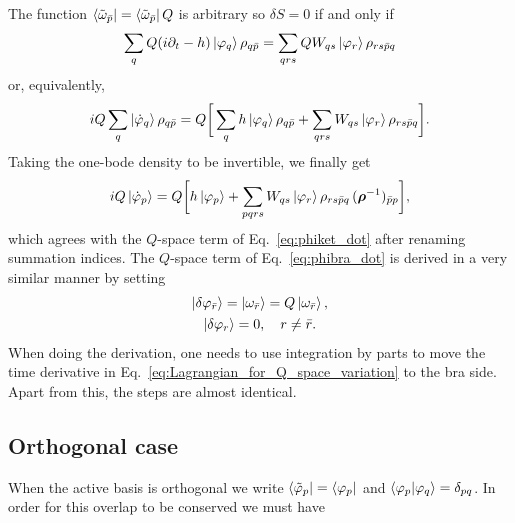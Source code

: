 \documentclass[aip,jcp,preprint,superscriptaddress,nofootinbib]{revtex4-1}
\begin{document}
The function $\bra{\tilde{\omega}_{\bar{p}}} = \bra{\tilde{\omega}_{\bar{p}}} Q$ is
arbitrary so $\delta S = 0$ if and only if
\begin{align}
    \sum_{q} Q (i \partial_t - h) \ket{\varphi_{q}} \rho_{q\bar{p}}
    = \sum_{qrs} Q W_{qs} \ket{\varphi_{r}} \rho_{rs\bar{p}q}
\end{align}
or, equivalently,
\begin{align}
    i Q \sum_{q} \ket{\dot{\varphi}_{q}} \rho_{q\bar{p}}
    = 
    Q \bigg[ \sum_{q} h \ket{\varphi_{q}} \rho_{q\bar{p}}
    + \sum_{qrs} W_{qs} \ket{\varphi_{r}} \rho_{rs\bar{p}q} \bigg].
\end{align}
Taking the one-bode density to be invertible, we finally get
\begin{align}
    i Q \ket{\dot{\varphi}_{p}}
    = 
    Q \bigg[ h \ket{\varphi_{p}}
    + \sum_{pqrs} W_{qs} \ket{\varphi_{r}} \rho_{rs\bar{p}q} \, (\bm{\rho}^{-1})_{\bar{p}p} \bigg],
\end{align}
which agrees with the $Q$-space term of Eq.~\eqref{eq:phiket_dot} after renaming summation indices.
The $Q$-space term of Eq.~\eqref{eq:phibra_dot} is derived in a very similar manner by setting
\begin{subequations}
    \begin{gather}
        \ket{\delta\varphi_{\bar{r}}} = \ket{\omega_{\bar{r}}} = Q \ket{\omega_{\bar{r}}}, \\
        \ket{\delta\varphi_{r}}  = 0, \quad r \neq \bar{r}.
    \end{gather}
\end{subequations}
When doing the derivation, one needs to use integration by parts 
to move the time derivative in Eq.~\eqref{eq:Lagrangian_for_Q_space_variation}
to the bra side. Apart from this, the steps are almost identical.


\subsection{Orthogonal case}
When the active basis is orthogonal we write $\bra{\tilde{\varphi}_{p}} = \bra{\varphi_{p}}$
and $\braket{\varphi_{p} | \varphi_{q}} = \delta_{pq}$. In order for this overlap
to be conserved we must have
\end{document}
